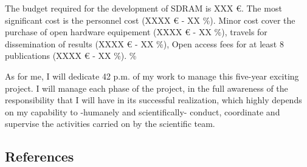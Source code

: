 \documentclass[
  12pt,
  a4paperpaper,
  onecolumn]{article}
\begin{document}
The budget required for the development of SDRAM is XXX €. The most
significant cost is the personnel cost (XXXX € - XX \%). Minor cost
cover the purchase of open hardware equipement (XXXX € - XX \%), travels
for dissemination of results (XXXX € - XX \%), Open access fees for at
least 8 publications (XXXX € - XX \%). \%

As for me, I will dedicate 42 p.m. of my work to manage this five-year
exciting project. I will manage each phase of the project, in the full
awareness of the responsibility that I will have in its successful
realization, which highly depends on my capability to -humanely and
scientifically- conduct, coordinate and supervise the activities carried
on by the scientific team.

\newpage

\hypertarget{references}{%
\subsection*{References}\label{references}}
\end{document}
